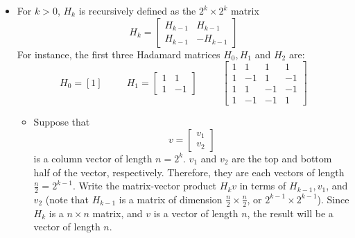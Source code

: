 \documentclass{article}
\begin{document}
\begin{itemize}
        \item For $k > 0$, $H_{k}$ is recursively defined as the $2^{k} \times 2^{k}$ matrix 
            \begin{equation*}
                H_{k} = \begin{bmatrix}
                    H_{k - 1} & H_{k - 1}  \\
                    H_{k - 1} & -H_{k - 1}   
                \end{bmatrix}
            \end{equation*}
        For instance, the first three Hadamard matrices $H_{0}, H_{1}$ and $H_{2}$ are:
            \begin{equation*}
                H_{0} = [1] \hspace{30pt} 
                H_{1} = \begin{bmatrix}
                    1 & 1  \\
                    1 & -1   
                \end{bmatrix} \hspace{30pt} 
                \begin{bmatrix}
                    1 & 1  & 1  & 1  \\
                    1 & -1 & 1  & -1 \\
                    1 & 1  & -1 & -1 \\
                    1 & -1 & -1 & 1    
                \end{bmatrix}
            \end{equation*}
            \begin{itemize}
                \item Suppose that
                    \begin{equation*}
                        v = \begin{bmatrix}
                            v_{1} \\
                            v_{2}   
                        \end{bmatrix}
                    \end{equation*}
                is a column vector of length $n = 2^{k}$. $v_{1}$ and $v_{2}$ are the top and bottom half of the vector, respectively. Therefore, they are each vectors of length $\frac{n}{2} = 2^{k - 1}$. Write the matrix-vector product $H_{k}v$ in terms of $H_{k - 1}, v_{1}$, and $v_{2}$ (note that $H_{k - 1}$ is a matrix of dimension $\frac{n}{2} \times \frac{n}{2}$, or $2^{k  -1} \times 2^{k - 1}$). Since $H_{k}$ is a $n \times n$ matrix, and $v$ is a vector of length $n$, the result will be a vector of length $n$.

\end{itemize}
\end{itemize}
\end{document}
